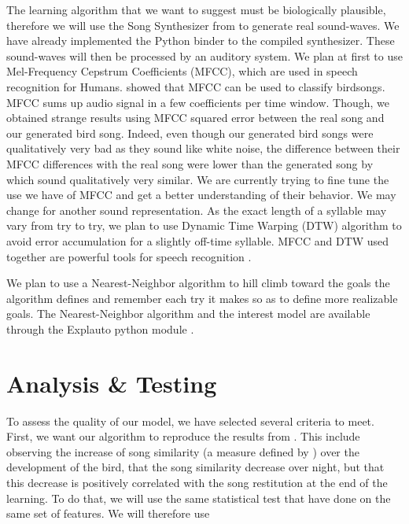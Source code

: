 \documentclass[a4paper, 11pt]{article}
\begin{document}
The learning algorithm that we want to suggest must be biologically plausible,
therefore we will use the Song Synthesizer from \textcite{boari_automatic_2015}
to generate real sound-waves. We have already implemented the Python binder to
the compiled synthesizer. These sound-waves will then be processed by an
auditory system. We plan at first to use Mel-Frequency Cepstrum Coefficients
(MFCC), which are used in speech recognition for Humans.
\textcite{chou_studies_2008} showed that MFCC can be used to classify birdsongs.
MFCC sums up audio signal in a few coefficients per time window. Though, we
obtained strange results using MFCC squared error between the real song and our
generated bird song. Indeed, even though our generated bird songs were
qualitatively very bad as they sound like white noise, the difference between
their MFCC differences with the real song were lower than the generated song by
\textcite{boari_automatic_2015} which sound qualitatively very similar. We are
currently trying to fine tune the use we have of MFCC and get a better
understanding of their behavior. We may change for another sound representation.
As the exact length of a syllable may vary from try to try, we plan to use
Dynamic Time Warping (DTW) algorithm to avoid error accumulation for a slightly
off-time syllable. MFCC and DTW used together are powerful tools for speech
recognition \parencite{muda_voice_2010}.

We plan to use a Nearest-Neighbor algorithm to hill climb toward the goals the
algorithm defines and remember each try it makes so as to define more realizable
goals. The Nearest-Neighbor algorithm and the interest model are available
through the Explauto python module \parencite{moulin-frier_explauto:_2014}.

\section*{Analysis \& Testing}

To assess the quality of our model, we have selected several criteria to meet.
First, we want our algorithm to reproduce the results from
\textcite{deregnaucourt_how_2005}. This include observing the increase of song
similarity (a measure defined by \textcite{tchernichovski_procedure_2000}) over
the development of the bird, that the song similarity decrease over night, but
that this decrease is positively correlated with the song restitution at the end
of the learning. To do that, we will use the same statistical test that
\textcite{deregnaucourt_how_2005} have done on the same set of features. We will
therefore use
\end{document}
